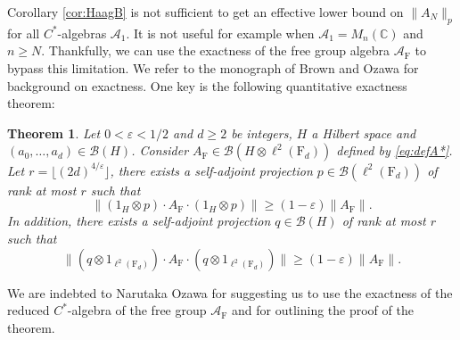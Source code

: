 \documentclass[11pt]{article}
\renewcommand{\star}{{\mathrm{F}}}
\newtheorem{theorem}[lemma]{Theorem}
\newcommand{\cA}{\mathcal{A}}
\newcommand{\dF}{\mathrm{F}}
\newcommand{\dC}{\mathbb {C}}
\newcommand{\cB}{\mathcal{B}}
\newcommand{\1}{1\!\!{\sf I}}
\newcommand{\veps}{\varepsilon}
\begin{document}
Corollary \ref{cor:HaagB} is not sufficient to get an effective lower bound on $\|A_N\|_p$ for all $C^*$-algebras $\cA_1$. It is not useful for example when $\cA_1 = M_n(\dC) $ and $n \geq N$.  Thankfully, we can use the exactness of the free group algebra $\cA_\star$ to bypass this limitation.   We refer to the monograph of Brown and Ozawa \cite[Chapter 5]{MR2391387} for background on exactness. One key is the following quantitative exactness theorem:
\begin{theorem}\label{th:exactness}
Let $0 < \veps < 1/2$ and $d\geq 2$ be integers, $H$ a Hilbert space and $(a_{0},\ldots ,a_d) \in \cB(H)$.  Consider $A_\star \in \cB(H\otimes \ell^2(\dF_d))$ defined by \eqref{eq:defA*}.
Let  $r = \lfloor (2d)^{4/\varepsilon} \rfloor$, there exists a self-adjoint projection $p\in \cB(\ell^2(\dF_d))$ of rank at most $r$ such that 
\begin{equation}\label{eq:NO}
\|( 1_H\otimes p ) \cdot A_\star \cdot ( 1_H\otimes p) \|\ge (1-\varepsilon ) \| A_\star \|.
\end{equation}
In addition, there exists a self-adjoint projection $q\in \cB(H)$ of rank at most $r$ such that
$$\| ( q \otimes 1_{\ell^2(\dF_d)} ) \cdot A_\star \cdot (q \otimes 1_{\ell^2(\dF_d)}) \|\ge (1-\varepsilon )\|A_\star \|.$$
\end{theorem}
We are indebted to Narutaka Ozawa for suggesting us to use the exactness of the reduced $C^*$-algebra of the free group $\cA_\star$ and for outlining the proof of the theorem. 
\end{document}
